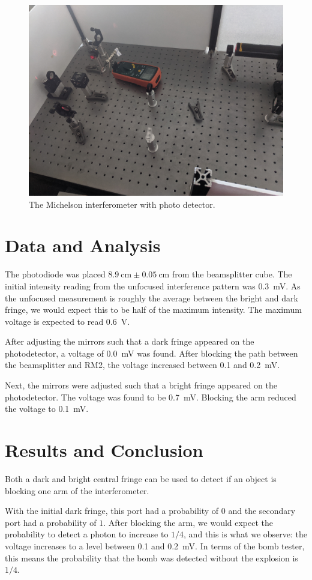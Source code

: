 \documentclass[notitlepage]{report}
\begin{document}
	\begin{figure}[h]
		\centering
		\includegraphics[width=0.7\linewidth]{PXL_20210211_222257140}
		\caption{The Michelson interferometer with photo detector.}
		\label{fig:pxl20210211222257140}
	\end{figure}
	
	
	\section{Data and Analysis}
	The photodiode was placed $\SI{8.9}{\centi\meter} \pm \SI{0.05}{\centi\meter}$ from the beamsplitter cube. The initial intensity reading from the unfocused interference pattern was \SI{0.3}{\mV}. As the unfocused measurement is roughly the average between the bright and dark fringe, we would expect this to be half of the maximum intensity. The maximum voltage is expected to read \SI{0.6}{\V}.
	
	After adjusting the mirrors such that a dark fringe appeared on the photodetector, a voltage of \SI{0.0}{\mV} was found. After blocking the path between the beamsplitter and RM2, the voltage increased between \num{0.1} and \SI{0.2}{\mV}.
	
	Next, the mirrors were adjusted such that a bright fringe appeared on the photodetector. The voltage was found to be \SI{0.7}{\mV}. Blocking the arm reduced the voltage to \SI{0.1}{\mV}.
	
	\section{Results and Conclusion}
	Both a dark and bright central fringe can be used to detect if an object is blocking one arm of the interferometer. 
	
	With the initial dark fringe, this port had a probability of $0$ and the secondary port had a probability of $1$. After blocking the arm, we would expect the probability to detect a photon to increase to $1/4$, and this is what we observe: the voltage increases to a level between \num{0.1} and \SI{0.2}{\mV}. In terms of the bomb tester, this means the probability that the bomb was detected without the explosion is $1/4$.
	
\end{document}
